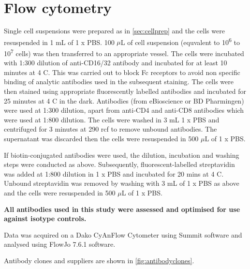 \section{Flow cytometry}

Single cell suspensions were prepared as in \cref{sec:cellprep} and the cells were resuspended in 1 mL of 1 x PBS.
100 $\mu$L of cell suspension (equvalent to 10\textsuperscript{6} to 10\textsuperscript{7} cells) was then transferred to an appropriate vessel.
The cells were incubated with 1:300 dilution of anti-CD16/32 antibody and incubated for at least 10 minutes at 4 \textdegree C.
This was carried out to block Fc receptors to avoid non specific binding of analytic antibodies used in the subsequent staining.
The cells were then stained using appropriate fluorescently labelled antibodies and incubated for 25 minutes at 4 \textdegree C in the dark.
Antibodies (from eBioscience or BD Pharmingen) were used at 1:300 dilution, apart from anti-CD4 and anti-CD8 antibodies which were used at 1:800 dilution. 
The cells were washed in 3 mL 1 x PBS and centrifuged for 3 minutes at 290 rcf to remove unbound antibodies.
The supernatant was discarded then the cells were resuspended in 500 $\mu$L of 1 x PBS.

If biotin-conjugated antibodies were used, the dilution, incubation and washing steps were conducted as above.
Subsequently, fluorescent-labelled streptavidin was added at 1:800 dilution in 1 x PBS and incubated for 20 mins at 4 \textdegree C.
Unbound streptavidin was removed by washing with 3 mL of 1 x PBS as above and the cells were resuspended in 500 $\mu$L of 1 x PBS.


\textbf{All antibodies used in this study were assessed and optimised for use against isotype controls.}

Data was acquired on a Dako CyAn\texttrademark  Flow Cytometer using Summit software and analysed using FlowJo 7.6.1 software.

Antibody clones and suppliers are shown in \cref{fig:antibodyclones}.


